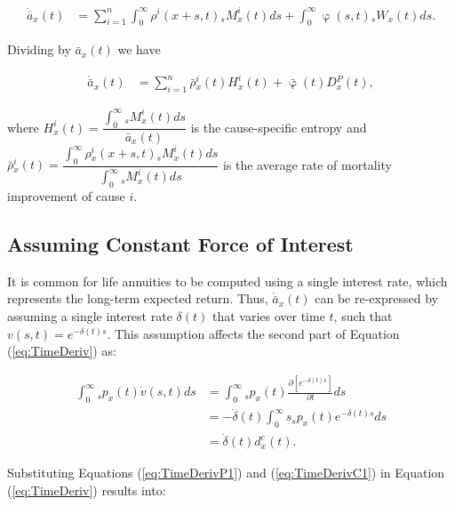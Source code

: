 \documentclass[12pt]{article}
\begin{document}
\begin{equation}\label{eq:TimeDerivCoD2}
\begin{split}
\dot{\bar{a}} _x(t) &= \sum_{i=1}^{n} \int_0^\infty  \rho^{i}(x+s,t){}_sM^{i}_x(t)ds +\int_0^\infty  \upvarphi(s,t) {}_sW_x(t) ds.
\end{split}
\end{equation}

Dividing by $\bar{a} _x(t)$ we have


\begin{equation}\label{eq:TimeDerivCoD3}
\begin{split}
\acute{\bar{a}} _x(t) &= \sum_{i=1}^{n} \bar{\rho}{^i_x}(t){H}^{i}_x(t)+\bar{\upvarphi}(t){D}{^P_x}(t),
\end{split}
\end{equation}


where ${H}^{i}_x(t)=\dfrac{\int_{0}^{\infty}{}_sM^{i}_x(t)ds}{\bar{a} _x(t)}$ is the cause-specific entropy and $\bar{\rho}{^i_x}(t)=\dfrac{\int_{0}^{\infty}\rho{_x^i}(x+s,t) {}_sM^{i}_x(t)ds}{\int_{0}^{\infty}{}_sM^{i}_x(t)ds}$ is the average rate of mortality improvement of cause $i$.

\subsection{Assuming Constant Force of Interest}

It is common for life annuities to be computed using a single interest rate, which represents the long-term expected return. Thus, $\acute{\bar{a}}_x(t)$ can be re-expressed by assuming a single interest rate $\delta(t)$ that varies over time $t$, such that $v(s,t) = e^{-\delta(t) s}$. This assumption affects the second part of Equation (\ref{eq:TimeDeriv}) as:


\begin{equation}\label{eq:TimeDerivC1}
\begin{split}
\int_0^\infty {}_s{p}_x(t) \dot{v}(s,t)ds &=\int_0^\infty {}_s{p}_x(t) \frac{\partial \left[ e^{-\delta(t)s} \right]}{\partial t}ds \\
&=-\dot{\delta}(t)\int_0^\infty s  {}_s{p}_x(t) e^{-\delta(t)s} ds \\
&=  \dot{\delta}(t)  d^{c}_x(t).
\end{split}
\end{equation}

Substituting Equations (\ref{eq:TimeDerivP1}) and (\ref{eq:TimeDerivC1}) in Equation (\ref{eq:TimeDeriv}) results into: 
\end{document}
